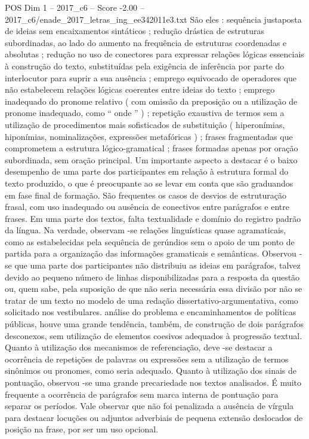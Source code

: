 \begin{textsample}{POS Dim 1 – 2017\_c6 – Score -2.00 – 2017\_c6/enade\_2017\_letras\_ing\_ee342011e3.txt}
São eles : sequência justaposta de ideias sem encaixamentos sintáticos ; redução drástica de estruturas subordinadas, ao lado do aumento na frequência de estruturas coordenadas e absolutas ; redução no uso de conectores para expressar relações lógicas essenciais à construção do texto, substituídas pela exigência de inferência por parte do interlocutor para suprir a sua ausência ; emprego equivocado de operadores que não estabelecem relações lógicas coerentes entre ideias do texto ; emprego inadequado do pronome relativo ( com omissão da preposição ou a utilização de pronome inadequado, como “ onde ” ) ; repetição exaustiva de termos sem a utilização de procedimentos mais sofisticados de substituição ( hiperonímias, hiponímias, nominalizações, expressões metafóricas ) ; frases fragmentadas que comprometem a estrutura lógico-gramatical ; frases formadas apenas por oração subordinada, sem oração principal.
Um importante aspecto a destacar é o baixo desempenho de uma parte dos participantes em relação à estrutura formal do texto produzido, o que é preocupante ao se levar em conta que são graduandos em fase final de formação.
São frequentes os casos de desvios de estruturação frasal, com uso inadequado ou ausência de conectivos entre parágrafos e entre frases.
Em uma parte dos textos, falta textualidade e domínio do registro padrão da língua.
Na verdade, observam -se relações linguísticas quase agramaticais, como as estabelecidas pela sequência de gerúndios sem o apoio de um ponto de partida para a organização das informações gramaticais e semânticas.
Observou -se que uma parte dos participantes não distribuiu as ideias em parágrafos, talvez devido ao pequeno número de linhas disponibilizadas para a resposta da questão ou, quem sabe, pela suposição de que não seria necessária essa divisão por não se tratar de um texto no modelo de uma redação dissertativo-argumentativa, como solicitado nos vestibulares. análise do problema e encaminhamentos de políticas públicas, houve uma grande tendência, também, de construção de dois parágrafos desconexos, sem utilização de elementos coesivos adequados à progressão textual.
Quanto à utilização dos mecanismos de referenciação, deve -se destacar a ocorrência de repetições de palavras ou expressões sem a utilização de termos sinônimos ou pronomes, como seria adequado.
Quanto à utilização dos sinais de pontuação, observou -se uma grande precariedade nos textos analisados.
É muito frequente a ocorrência de parágrafos sem marca interna de pontuação para separar os períodos.
Vale observar que não foi penalizada a ausência de vírgula para destacar locuções ou adjuntos adverbiais de pequena extensão deslocados de posição na frase, por ser um uso opcional.

\end{textsample}
